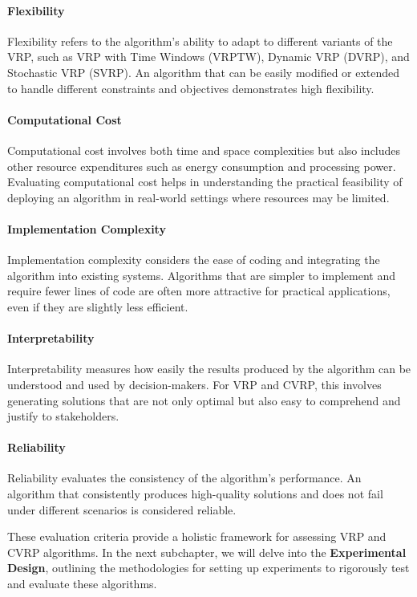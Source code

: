 \documentclass[
]{article}
\begin{document}
\paragraph{Flexibility}
Flexibility refers to the algorithm's ability to adapt to different variants of the VRP, such as VRP with Time Windows (VRPTW), Dynamic VRP (DVRP), and Stochastic VRP (SVRP). An algorithm that can be easily modified or extended to handle different constraints and objectives demonstrates high flexibility.

\paragraph{Computational Cost}
Computational cost involves both time and space complexities but also includes other resource expenditures such as energy consumption and processing power. Evaluating computational cost helps in understanding the practical feasibility of deploying an algorithm in real-world settings where resources may be limited.

\paragraph{Implementation Complexity}
Implementation complexity considers the ease of coding and integrating the algorithm into existing systems. Algorithms that are simpler to implement and require fewer lines of code are often more attractive for practical applications, even if they are slightly less efficient.

\paragraph{Interpretability}
Interpretability measures how easily the results produced by the algorithm can be understood and used by decision-makers. For VRP and CVRP, this involves generating solutions that are not only optimal but also easy to comprehend and justify to stakeholders.

\paragraph{Reliability}
Reliability evaluates the consistency of the algorithm's performance. An algorithm that consistently produces high-quality solutions and does not fail under different scenarios is considered reliable.

These evaluation criteria provide a holistic framework for assessing VRP and CVRP algorithms. In the next subchapter, we will delve into the \textbf{Experimental Design}, outlining the methodologies for setting up experiments to rigorously test and evaluate these algorithms.
\end{document}
